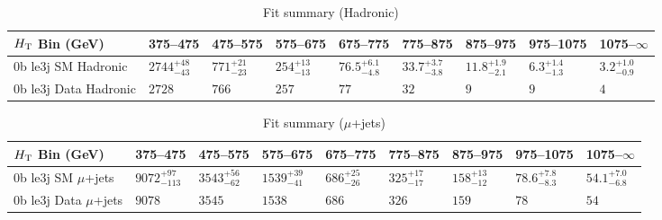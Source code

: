 \documentclass[8pt]{article}
\def\scalht{\mbox{$H_{\rm{T}}$}\xspace}
\newcommand\T{\rule{0pt}{2.6ex}}
\begin{document}
\begin{table}[ht!]
\caption{Fit summary (Hadronic)}
\label{tab:ensemble-summary}
\centering
\begin{tabular}{ lllllllll }

\hline
\scalht Bin (GeV)       & 375--475                       & 475--575                       & 575--675                       & 675--775                       & 775--875                       & 875--975                       & 975--1075                      & 1075--$\infty$                 \\ [1.000000ex]
\hline
0b le3j SM Hadronic\T   & $2744^{+48}_{-43}$             & $771^{+21}_{-23}$              & $254^{+13}_{-13}$              & $76.5^{+6.1}_{-4.8}$           & $33.7^{+3.7}_{-3.8}$           & $11.8^{+1.9}_{-2.1}$           & $6.3^{+1.4}_{-1.3}$            & $3.2^{+1.0}_{-0.9}$            \\ 
0b le3j Data Hadronic\T & $2728$                         & $766$                          & $257$                          & $77$                           & $32$                           & $9$                            & $9$                            & $4$                            \\ 
\hline

\end{tabular}
\end{table}
\begin{table}[ht!]
\caption{Fit summary ($\mu$+jets)}
\label{tab:ensemble-summary}
\centering
\begin{tabular}{ lllllllll }

\hline
\scalht Bin (GeV)       & 375--475                       & 475--575                       & 575--675                       & 675--775                       & 775--875                       & 875--975                       & 975--1075                      & 1075--$\infty$                 \\ [1.000000ex]
\hline
0b le3j SM $\mu$+jets\T & $9072^{+97}_{-113}$            & $3543^{+56}_{-62}$             & $1539^{+39}_{-41}$             & $686^{+25}_{-26}$              & $325^{+17}_{-17}$              & $158^{+13}_{-12}$              & $78.6^{+7.8}_{-8.3}$           & $54.1^{+7.0}_{-6.8}$           \\ 
0b le3j Data $\mu$+jets\T & $9078$                         & $3545$                         & $1538$                         & $686$                          & $326$                          & $159$                          & $78$                           & $54$                           \\ 
\hline

\end{tabular}
\end{table}
\end{document}
